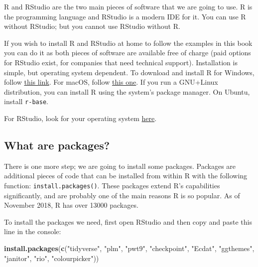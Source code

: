 \documentclass[]{gitbook}
\newenvironment{Shaded}{\begin{snugshade}}{\end{snugshade}}
\newcommand{\KeywordTok}[1]{\textcolor[rgb]{0.13,0.29,0.53}{\textbf{#1}}}
\newcommand{\NormalTok}[1]{#1}
\newcommand{\StringTok}[1]{\textcolor[rgb]{0.31,0.60,0.02}{#1}}
\theoremstyle{definition}
\theoremstyle{definition}
\theoremstyle{definition}
\theoremstyle{remark}
\begin{document}
R and RStudio are the two main pieces of software that we are going to
use. R is the programming language and RStudio is a modern IDE for it.
You can use R without RStudio; but you cannot use RStudio without R.

If you wish to install R and RStudio at home to follow the examples in
this book you can do it as both pieces of software are available free of
charge (paid options for RStudio exist, for companies that need
technical support). Installation is simple, but operating system
dependent. To download and install R for Windows, follow
\href{https://cloud.r-project.org/bin/windows/base/}{this link}. For
macOS, follow \href{https://cloud.r-project.org/bin/macosx/}{this one}.
If you run a GNU+Linux distribution, you can install R using the
system's package manager. On Ubuntu, install \texttt{r-base}.

For RStudio, look for your operating system
\href{https://www.rstudio.com/products/rstudio/download/\#download}{here}.

\hypertarget{what-are-packages}{%
\subsection*{What are packages?}\label{what-are-packages}}

There is one more step; we are going to install some packages. Packages
are additional pieces of code that can be installed from within R with
the following function: \texttt{install.packages()}. These packages
extend R's capabilities significantly, and are probably one of the main
reasons R is so popular. As of November 2018, R has over 13000 packages.

To install the packages we need, first open RStudio and then copy and
paste this line in the console:

\begin{Shaded}
\begin{Highlighting}[]
\KeywordTok{install.packages}\NormalTok{(}\KeywordTok{c}\NormalTok{(}\StringTok{"tidyverse"}\NormalTok{, }\StringTok{"plm"}\NormalTok{, }\StringTok{"pwt9"}\NormalTok{, }\StringTok{"checkpoint"}\NormalTok{, }\StringTok{"Ecdat"}\NormalTok{, }\StringTok{"ggthemes"}\NormalTok{, }\StringTok{"janitor"}\NormalTok{, }\StringTok{"rio"}\NormalTok{, }\StringTok{"colourpicker"}\NormalTok{))}
\end{Highlighting}
\end{Shaded}
\end{document}
